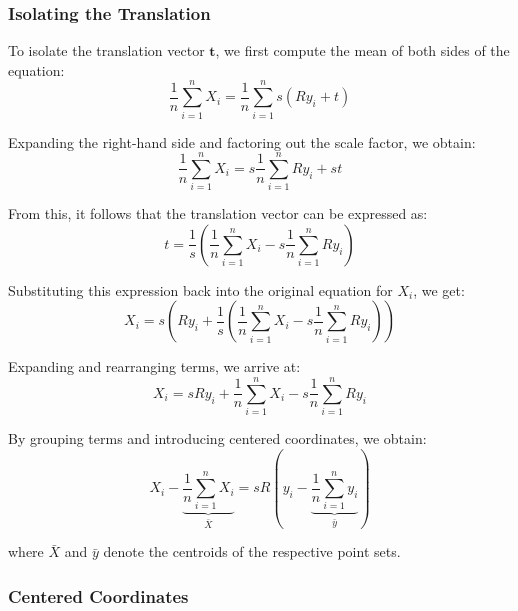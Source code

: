 \documentclass[11pt,a4paper]{article}
\theoremstyle{definition}
\theoremstyle{plain}
\theoremstyle{remark}
\begin{document}
\subsubsection{Isolating the Translation}\label{subsubsec:isolating_translation}

To isolate the translation vector $\mathbf{t}$, we first compute the mean of both sides of the equation:
\begin{equation} \nonumber
    \frac{1}{n}\sum_{i=1}^{n} X_i = \frac{1}{n}\sum_{i=1}^{n} s (R y_i + t)
\end{equation}

Expanding the right-hand side and factoring out the scale factor, we obtain:
\begin{equation} \nonumber
    \frac{1}{n}\sum_{i=1}^{n} X_i = s \frac{1}{n}\sum_{i=1}^{n} R y_i + s t
\end{equation}

From this, it follows that the translation vector can be expressed as:
\begin{equation} \nonumber
    t = \frac{1}{s} \left( \frac{1}{n}\sum_{i=1}^{n} X_i - s \frac{1}{n}\sum_{i=1}^{n} R y_i \right)
\end{equation}

Substituting this expression back into the original equation for $X_i$, we get:
\begin{equation} \nonumber
    X_i = s \left(R y_i + \frac{1}{s} \left( \frac{1}{n}\sum_{i=1}^{n} X_i - s \frac{1}{n}\sum_{i=1}^{n} R y_i \right)\right)
\end{equation}

Expanding and rearranging terms, we arrive at:
\begin{equation} \nonumber
    X_i = s R y_i + \frac{1}{n}\sum_{i=1}^{n} X_i - s \frac{1}{n}\sum_{i=1}^{n} R y_i
\end{equation}

By grouping terms and introducing centered coordinates, we obtain:
\begin{equation} \nonumber
    X_i - \underbrace{\frac{1}{n}\sum_{i=1}^{n} X_i}_{\bar{X}} = s R \left(y_i - \underbrace{\frac{1}{n}\sum_{i=1}^{n} y_i}_{\bar{y}}\right)
\end{equation}

where $\bar{X}$ and $\bar{y}$ denote the centroids of the respective point sets.

\subsubsection{Centered Coordinates}\label{subsubsec:centered_coordinates}
\end{document}

